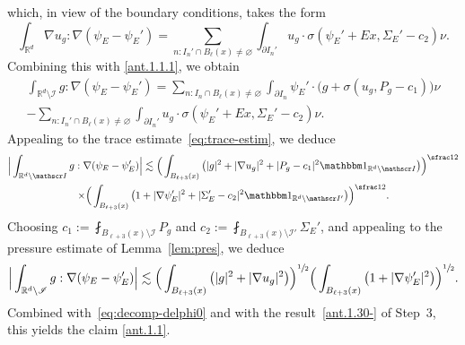 \documentclass[JEP,XML,SOM,Unicode,published]{cedram}
\let\mathcal\mathscr
\let\mathds\mathbbm
\theoremstyle{plain}
\theoremstyle{definition}
\newcommand{\R}{\mathbb R}
\newcommand{\Ic}{\mathcal I}
\begin{document}
which, in view of the boundary conditions, takes the form
\begin{equation*}
\int_{\R^d}\nabla u_g :\nabla(\psi_E-\psi_E')=
\sum_{n:I_n'\cap B_\ell(x)\ne\varnothing}\int_{\partial I_{n}'} u_g\cdot\sigma(\psi_E'+Ex,\Sigma_E'-c_2)\nu.
\end{equation*}
Combining this with \eqref{ant.1.1.1}, we obtain
\begin{multline*}
\int_{\R^d\setminus\Ic }g:\nabla(\psi_E-\psi_E')=
\sum_{n:I_n\cap B_\ell(x)\ne\varnothing}\int_{\partial I_n}\psi_E'\cdot\big(g+\sigma(u_g,P_g-c_1)\big)\nu\\
-\sum_{n:I_n'\cap B_\ell(x)\ne\varnothing}\int_{\partial I_{n}'} u_g \cdot\sigma(\psi_E'+Ex,\Sigma_E'-c_2)\nu.
\end{multline*}
Appealing to the trace estimate~\eqref{eq:trace-estim}, we deduce
\begin{multline*}
\Big|\int_{\R^d\setminus\Ic }g:\nabla(\psi_E-\psi_E')\Big|
\lesssim \Big(\int_{B_{\ell+3}(x)}\big(|g|^2+|\nabla u_g|^2+|P_g -c_1|^2\mathds1_{\R^d\setminus\Ic }\big)\Big)^{\sfrac12}\\
\times\Big(\int_{B_{\ell+3}(x)}\big(1+|\nabla\psi_E'|^2+|\Sigma_E'-c_2|^2\mathds1_{\R^d\setminus\Ic '}\big)\Big)^{\sfrac12}.
\end{multline*}
Choosing $c_1:=\fint_{B_{\ell+3}(x)\setminus\Ic }P_g$ and $c_2:=\fint_{B_{\ell+3}(x)\setminus\Ic' }\Sigma_E'$, and appealing to the pressure estimate of Lemma~\ref{lem:pres},
we deduce
\begin{equation*}\label{eq:preant1.1}
\Big|\int_{\R^d\setminus\Ic }g:\nabla(\psi_E-\psi_E')\Big|
\lesssim \Big(\int_{B_{\ell+3}(x)}\big(|g|^2+|\nabla u_g|^2\big)\Big)^{\sfrac12}
\Big(\int_{B_{\ell+3}(x)}\big(1+|\nabla\psi_E'|^2\big)\Big)^{\sfrac12}.
\end{equation*}
Combined with~\eqref{eq:decomp-delphi0} and with the result~\eqref{ant.1.30-} of Step~3, this yields the claim \eqref{ant.1.1}.
\end{document}

